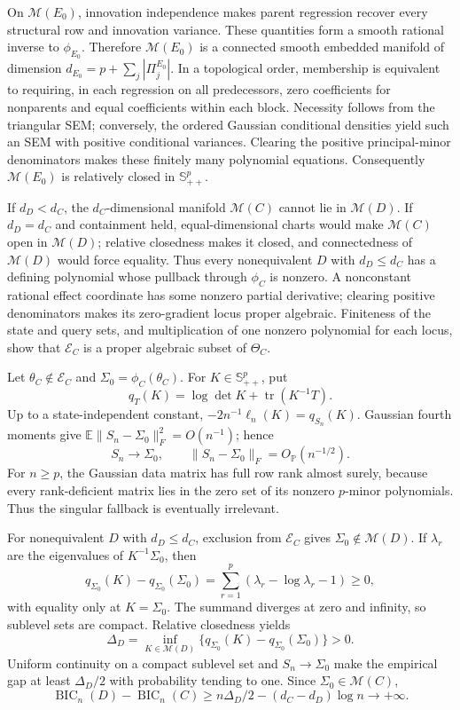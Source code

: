 On \(\mathcal M(E_0)\), innovation independence makes parent regression recover every structural row and innovation variance.  These quantities form a smooth rational inverse to \(\phi_{E_0}\).  Therefore \(\mathcal M(E_0)\) is a connected smooth embedded manifold of dimension \(d_{E_0}=p+\sum_j|\Pi^{E_0}_j|\).  In a topological order, membership is equivalent to requiring, in each regression on all predecessors, zero coefficients for nonparents and equal coefficients within each block.  Necessity follows from the triangular SEM; conversely, the ordered Gaussian conditional densities yield such an SEM with positive conditional variances.  Clearing the positive principal-minor denominators makes these finitely many polynomial equations.  Consequently \(\mathcal M(E_0)\) is relatively closed in \(\mathbb S^p_{++}\).

If \(d_D<d_C\), the \(d_C\)-dimensional manifold \(\mathcal M(C)\) cannot lie in \(\mathcal M(D)\).  If \(d_D=d_C\) and containment held, equal-dimensional charts would make \(\mathcal M(C)\) open in \(\mathcal M(D)\); relative closedness makes it closed, and connectedness of \(\mathcal M(D)\) would force equality.  Thus every nonequivalent \(D\) with \(d_D\le d_C\) has a defining polynomial whose pullback through \(\phi_C\) is nonzero.  A nonconstant rational effect coordinate has some nonzero partial derivative; clearing positive denominators makes its zero-gradient locus proper algebraic.  Finiteness of the state and query sets, and multiplication of one nonzero polynomial for each locus, show that \(\mathcal E_C\) is a proper algebraic subset of \(\Theta_C\).

Let \(\theta_C\notin\mathcal E_C\) and \(\Sigma_0=\phi_C(\theta_C)\).  For \(K\in\mathbb S^p_{++}\), put
\[
 q_T(K)=\log\det K+\operatorname{tr}(K^{-1}T).
\]
Up to a state-independent constant, \(-2n^{-1}\ell_n(K)=q_{S_n}(K)\).  Gaussian fourth moments give \(\mathbb E\|S_n-\Sigma_0\|_F^2=O(n^{-1})\); hence
\[
 S_n\to\Sigma_0,\qquad \|S_n-\Sigma_0\|_F=O_{\mathbb P}(n^{-1/2}).
\]
For \(n\ge p\), the Gaussian data matrix has full row rank almost surely, because every rank-deficient matrix lies in the zero set of its nonzero \(p\)-minor polynomials.  Thus the singular fallback is eventually irrelevant.

For nonequivalent \(D\) with \(d_D\le d_C\), exclusion from \(\mathcal E_C\) gives \(\Sigma_0\notin\mathcal M(D)\).  If \(\lambda_r\) are the eigenvalues of \(K^{-1}\Sigma_0\), then
\[
 q_{\Sigma_0}(K)-q_{\Sigma_0}(\Sigma_0)
 =\sum_{r=1}^p(\lambda_r-\log\lambda_r-1)\ge0,
\]
with equality only at \(K=\Sigma_0\).  The summand diverges at zero and infinity, so sublevel sets are compact.  Relative closedness yields
\[
 \Delta_D=\inf_{K\in\mathcal M(D)}
 \{q_{\Sigma_0}(K)-q_{\Sigma_0}(\Sigma_0)\}>0.
\]
Uniform continuity on a compact sublevel set and \(S_n\to\Sigma_0\) make the empirical gap at least \(\Delta_D/2\) with probability tending to one.  Since \(\Sigma_0\in\mathcal M(C)\),
\[
 \operatorname{BIC}_n(D)-\operatorname{BIC}_n(C)
 \ge n\Delta_D/2-(d_C-d_D)\log n\to+\infty.
\]

